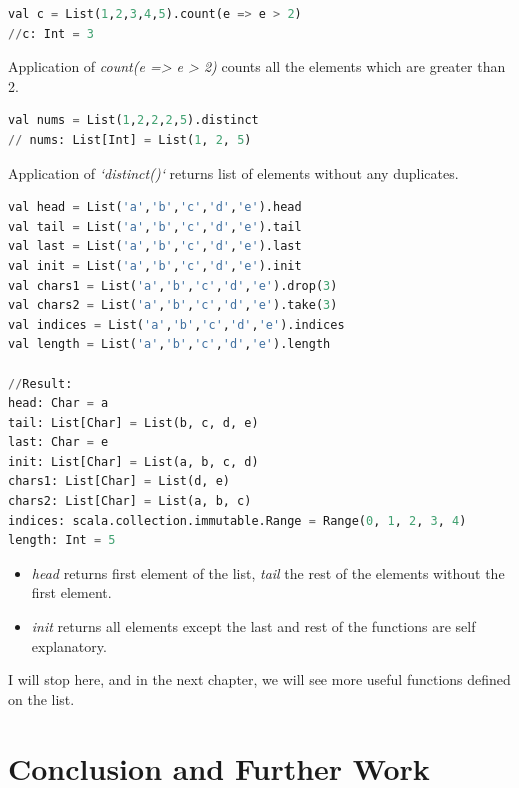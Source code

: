 \documentclass[12pt,twoside,a4paper]{report}
\begin{document}
\begin{lstlisting}[language=python]
val c = List(1,2,3,4,5).count(e => e > 2)  
//c: Int = 3
\end{lstlisting}
Application of \emph{count(e => e > 2)} counts all the elements which are greater than 2.

\begin{lstlisting}[language=python]
val nums = List(1,2,2,2,5).distinct
// nums: List[Int] = List(1, 2, 5)
\end{lstlisting}

Application of \emph{`distinct()`} returns list of elements without any duplicates.

\begin{lstlisting}[language=python]
val head = List('a','b','c','d','e').head
val tail = List('a','b','c','d','e').tail
val last = List('a','b','c','d','e').last
val init = List('a','b','c','d','e').init
val chars1 = List('a','b','c','d','e').drop(3)
val chars2 = List('a','b','c','d','e').take(3)
val indices = List('a','b','c','d','e').indices
val length = List('a','b','c','d','e').length

//Result:
head: Char = a
tail: List[Char] = List(b, c, d, e)
last: Char = e
init: List[Char] = List(a, b, c, d)
chars1: List[Char] = List(d, e)
chars2: List[Char] = List(a, b, c)
indices: scala.collection.immutable.Range = Range(0, 1, 2, 3, 4)
length: Int = 5
\end{lstlisting}

\begin{itemize}\itemsep1pt \parskip0pt 
\item \emph{head} returns first element of the list, \emph{tail} the rest of the elements without the first element.
\item \emph{init} returns all elements except the last and rest of the functions are self explanatory.
\end{itemize}

I will stop here, and in the next chapter, we will see more useful functions defined on the list.





\chapter{Conclusion and Further Work}\label{7}

\end{document}
